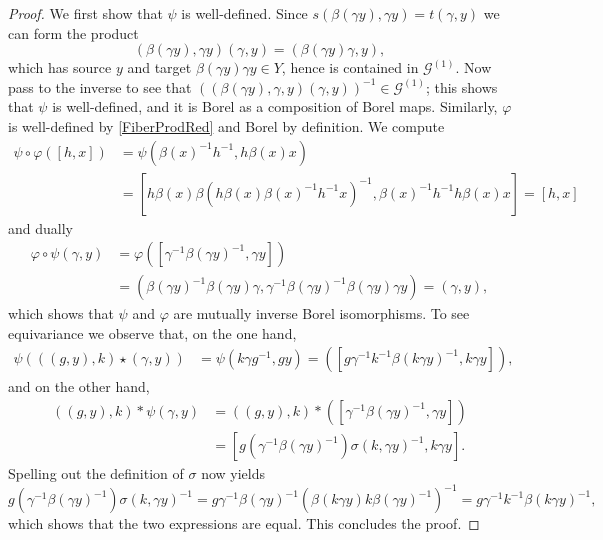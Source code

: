 \documentclass[10pt,a4paper]{amsart}
\newcommand{\cG}{\mathcal{G}}
\renewcommand{\phi}{\varphi}
\begin{document}
\begin{proof} We first show that $\psi$ is well-defined. Since $s(\beta(\gamma y), \gamma y) = t(\gamma, y)$ we can form the product
\[
(\beta(\gamma y), \gamma y)(\gamma, y) = (\beta(\gamma y)\gamma, y),
\]
which has source $y$ and target $\beta(\gamma y)\gamma y \in Y$, hence is contained in $\cG^{(1)}$. Now pass to the inverse to see that $((\beta(\gamma y), \gamma, y)(\gamma, y))^{-1} \in \cG^{(1)}$; this shows that $\psi$ is well-defined, and it is Borel as a composition of Borel maps. Similarly, $\phi$ is well-defined by \eqref{FiberProdRed} and Borel by definition. We compute 
  \begin{align*}
    \psi \circ \phi([h,x]) &= \psi(\beta(x)^{-1} h^{-1},h \beta(x) x)\\
     & = [h \beta(x) \beta(h \beta(x)\beta(x)^{-1} h^{-1}x)^{-1} , \beta(x)^{-1} h^{-1}h\beta(x) x ] = [h,x]
  \end{align*}
  and dually
  \begin{align*}
  \phi\circ \psi(\gamma,y)&= \phi ([\gamma^{-1}\beta( \gamma y)^{-1},\gamma y])\\
 &= (\beta(\gamma y)^{-1}\beta( \gamma y) \gamma , \gamma^{-1}\beta(\gamma y)^{-1} \beta(\gamma y)\gamma y)=(\gamma,y),
  \end{align*}
  which shows that $\psi$ and $\phi$ are mutually inverse Borel isomorphisms. To see equivariance we observe that, on the one hand,
\begin{align*}
    \psi(((g,y),k)\star (\gamma,y))&=\psi(k\gamma g^{-1},gy) =([g\gamma^{-1}k^{-1} \beta(k\gamma y)^{-1},k\gamma y]),
\end{align*}
and on the other hand,
\begin{align*}
   ((g,y),k)  \ast \psi(\gamma,y)&=   ((g,y),k)\ast  ([\gamma^{-1}\beta(\gamma y)^{-1},\gamma y])\\
   &=[g(\gamma^{-1}\beta(\gamma y)^{-1})\sigma(k,\gamma y)^{-1},k\gamma y].
\end{align*}
Spelling out the definition of $\sigma$ now yields
\[
g(\gamma^{-1}\beta(\gamma y)^{-1})\sigma(k,\gamma y)^{-1} = g\gamma^{-1}\beta(\gamma y)^{-1}(\beta(k \gamma y)k \beta(\gamma y)^{-1})^{-1}
= g \gamma^{-1}k^{-1}\beta(k\gamma y)^{-1},
\]
which shows that the two expressions are equal. This concludes the proof.
\end{proof}
\end{document}
